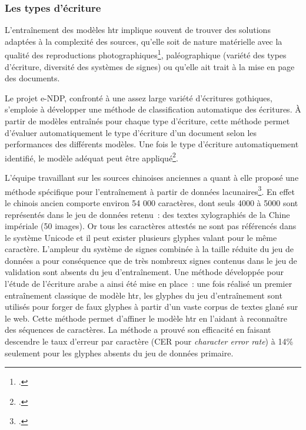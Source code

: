 \documentclass[a4paper,12pt,twoside]{book}
\begin{document}
				\subsubsection{Les types d'écriture}
				
				L'entraînement des modèles \gls{htr} implique souvent de trouver des solutions
				adaptées à la complexité des sources, qu'elle soit de nature matérielle
				avec la qualité des reproductions photographiques\footcite{leblancTranskribusEScriptoriumRetour2022}, paléographique (variété
				des types d'écriture, diversité des systèmes de signes) ou qu'elle ait
				trait à la mise en page des documents.
				
				Le projet e-NDP, confronté à une assez large variété d'écritures
				gothiques, s'emploie à développer une méthode de classification
				automatique des écritures. À partir de modèles entraînés pour chaque
				type d'écriture, cette méthode permet d'évaluer automatiquement le type
				d'écriture d'un document selon les performances des différents modèles.
				Une fois le type d'écriture automatiquement identifié, le modèle adéquat
				peut être appliqué\footcite{torresaguilarModelisationAffinageHTR2022}.
				
				L'équipe travaillant sur les sources chinoises anciennes a quant à elle
				proposé une méthode spécifique pour l'entraînement à partir de données
				lacunaires\footcite{bizais-lilligExperimentationsPourAnalyse2022}. En effet
				le chinois ancien comporte environ 54 000 caractères, dont seuls 4000 à
				5000 sont représentés dans le jeu de données retenu~: des textes
				xylographiés de la Chine impériale (50 images). Or tous les caractères
				attestés ne sont pas référencés dans le système Unicode et il peut
				exister plusieurs glyphes valant pour le même caractère. L'ampleur du
				système de signes combinée à la taille réduite du jeu de données a pour
				conséquence que de très nombreux signes contenus dans le jeu de
				validation sont absents du jeu d'entraînement. Une méthode développée
				pour l'étude de l'écriture arabe a ainsi été mise en place~: une fois
				réalisé un premier entraînement classique de modèle \gls{htr}, les glyphes du
				jeu d'entraînement sont utilisés pour forger de faux glyphes à partir
				d'un vaste corpus de textes glané sur le web. Cette méthode permet
				d'affiner le modèle \gls{htr} en l'aidant à reconnaître des séquences de
				caractères. La méthode a prouvé son efficacité en faisant descendre le
				taux d'erreur par caractère (CER pour \textit{character error rate}) à
				14\% seulement pour les glyphes absents du jeu de données primaire.
				
\end{document}
